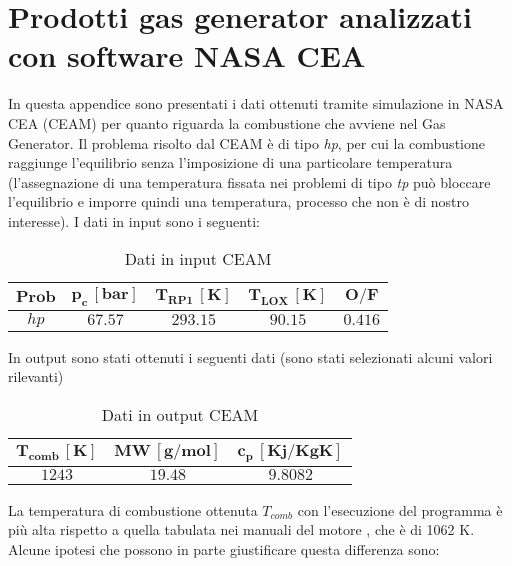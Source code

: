 \section{Prodotti gas generator analizzati con software NASA CEA}
\label{appendix:prodotti_gas_generator}

In questa appendice sono presentati i dati ottenuti tramite simulazione in NASA CEA (CEAM) per quanto riguarda la combustione che avviene nel Gas Generator. Il problema risolto dal CEAM è di tipo \textit{hp}, per cui la combustione raggiunge l'equilibrio senza l'imposizione di una particolare temperatura (l'assegnazione di una temperatura fissata nei problemi di tipo \textit{tp} può bloccare l'equilibrio e imporre quindi una temperatura, processo che non è di nostro interesse). I dati in input sono i seguenti:
\\
\begin{table}[H]

\centering
\begin{tabular}{|c|c|c|c|c|}
\hline
$\bm{Prob}$ & $\bm{p_c \, [bar]}$ & $\bm{T_{RP1} \, [K]}$ & $\bm{T_{LOX} \, [K]}$ & $\bm{O/F}$ \\
\hline
$hp$ & $67.57$ & $293.15$ & $90.15$ & $0.416$ \\
\hline
\end{tabular}
\caption{Dati in input CEAM}
\label{table:input_CEAM}
\end{table}
In output sono stati ottenuti i seguenti dati (sono stati selezionati alcuni valori rilevanti)
\begin{table}[H]

\centering
\begin{tabular}{|c|c|c|}
\hline
$\bm{T_{comb} \, [K]}$ & $\bm{MW \, [g/mol]}$ & $\bm{c_p \, [Kj/KgK]}$ \\
\hline
$1243$ & $19.48$ & $9.8082$\\
\hline
\end{tabular}

\caption{Dati in output CEAM}
\label{table:output_CEAM}

\end{table}
La temperatura di combustione ottenuta $T_{comb}$ con l'esecuzione del programma è più alta rispetto a quella tabulata nei manuali del motore \cite{f-1_manual}, che è di 1062 K. Alcune ipotesi che possono in parte giustificare questa differenza sono:
